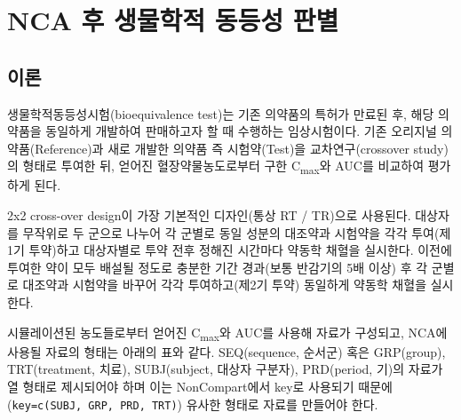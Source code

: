 \documentclass[
  11pt,
  krantz2, a4paper, twoside]{krantz}
\theoremstyle{definition}
\theoremstyle{definition}
\theoremstyle{definition}
\theoremstyle{definition}
\theoremstyle{remark}
\begin{document}
\hypertarget{bioequivalence}{%
\section{NCA 후 생물학적 동등성 판별}\label{bioequivalence}}

\hypertarget{uxc774uxb860}{%
\subsection{이론}\label{uxc774uxb860}}

생물학적동등성시험(bioequivalence test)는 기존 의약품의 특허가 만료된 후, 해당 의약품을 동일하게 개발하여 판매하고자 할 때 수행하는 임상시험이다.
기존 오리지널 의약품(Reference)과 새로 개발한 의약품 즉 시험약(Test)을 교차연구(crossover study)의 형태로 투여한 뒤, 얻어진 혈장약물농도로부터 구한 C\textsubscript{max}와 AUC를 비교하여 평가하게 된다.

2x2 cross-over design이 가장 기본적인 디자인(통상 RT / TR)으로 사용된다. 대상자를 무작위로 두 군으로 나누어 각 군별로 동일 성분의 대조약과 시험약을 각각 투여(제1기 투약)하고 대상자별로 투약 전후 정해진 시간마다 약동학 채혈을 실시한다. 이전에 투여한 약이 모두 배설될 정도로 충분한 기간 경과(보통 반감기의 5배 이상) 후 각 군별로 대조약과 시험약을 바꾸어 각각 투여하고(제2기 투약) 동일하게 약동학 채혈을 실시한다. 

시뮬레이션된 농도들로부터 얻어진 C\textsubscript{max}와 AUC를 사용해 자료가 구성되고, NCA에 사용될 자료의 형태는 아래의 표와 같다. SEQ(sequence, 순서군) 혹은 GRP(group), TRT(treatment, 치료), SUBJ(subject, 대상자 구분자), PRD(period, 기)의 자료가 열 형태로 제시되어야 하며 이는 NonCompart에서 key로 사용되기 때문에(\texttt{key=c(\textquotesingle{}SUBJ\textquotesingle{},\ \textquotesingle{}GRP\textquotesingle{},\ \textquotesingle{}PRD\textquotesingle{},\ \textquotesingle{}TRT\textquotesingle{})}) 유사한 형태로 자료를 만들어야 한다. 
\end{document}
